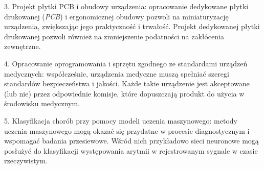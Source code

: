 \newpage

3. Projekt płytki PCB i obudowy urządzenia: opracowanie dedykowane płytki drukowanej (\textit{PCB})
i ergonomicznej obudowy pozwoli na miniaturyzację urządzenia, zwiększając jego praktyczność
i trwałość. Projekt dedykowanej płytki drukowanej pozwoli również na zmniejszenie podatności 
na zakłócenia zewnętrzne. 

4. Opracowanie oprogramowania i sprzętu zgodnego ze standardami urządzeń medycznych:
współcześnie, urządzenia medyczne muszą spełniać szeregi standardów bezpieczeństwa i jakości.
Każde takie urządzenie jest akceptowane (lub nie) przez odpowiednie komisje, które dopuszczają
produkt do użycia w środowisku medycznym.

5. Klasyfikacja chorób przy pomocy modeli uczenia maszynowego: metody uczenia maszynowego
mogą okazać się przydatne w procesie diagnostycznym i wspomagać badania przesiewowe.
Wśród nich przykładowo sieci neuronowe mogą posłużyć do klasyfikacji występowania 
arytmii w rejestrowanym sygnale w czasie rzeczywistym.

